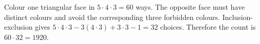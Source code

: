 Colour one triangular face in $5\cdot4\cdot3=60$ ways. The opposite face must have distinct colours and avoid the corresponding three forbidden colours. Inclusion-exclusion gives $5\cdot4\cdot3-3(4\cdot3)+3\cdot3-1=32$ choices. Therefore the count is $60\cdot32=\boxed{1920}$.
